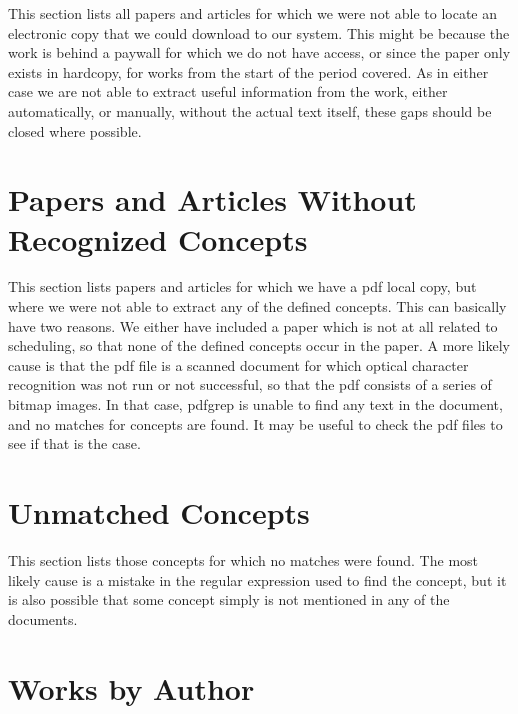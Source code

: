 \documentclass[a4paper]{article}
\begin{document}
This section lists all papers and articles for which we were not able to locate an electronic copy that we could download to our system. This might be because the work is behind a paywall for which we do not have access, or since the paper only exists in hardcopy, for works from the start of the period covered. As in either case we are not able to extract useful information from the work, either automatically, or manually, without the actual text itself, these gaps should be closed where possible.





\clearpage
\section{Papers and Articles Without Recognized Concepts}

This section lists papers and articles for which we have a pdf local copy, but where we were not able to extract any of the defined concepts. This can basically have two reasons. We either have included a paper which is not at all related to scheduling, so that none of the defined concepts occur in the paper. A  more likely cause is that the pdf file is a scanned document for which optical character recognition was not run or not successful, so that the pdf consists of a series of bitmap images. In that case, pdfgrep is unable to find any text in the document, and no matches for concepts are found. It may be useful to check the pdf files to see if that is the case.





\clearpage
\section{Unmatched Concepts}

This section lists those concepts for which no matches were found. The most likely cause is a mistake in the regular expression used to find the concept, but it is also possible that some concept simply is not mentioned in any of the documents. 



\clearpage
\section{Works by Author}
\end{document}
